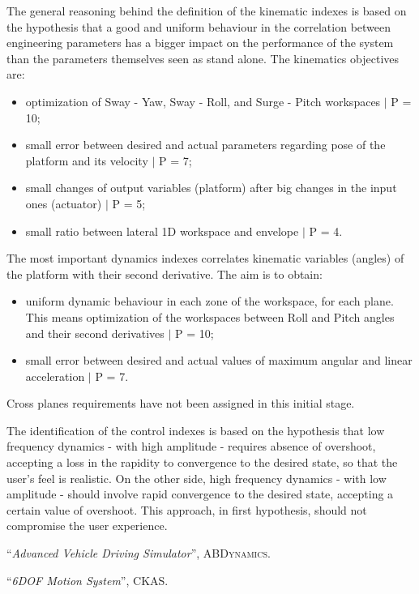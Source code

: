 \documentclass[10.5pt, twocolumn]{article}
\newcommand{\Virgolette}[1]{``#1''}
\begin{document}
The general reasoning behind the definition of the kinematic indexes is based on the hypothesis that a good and uniform behaviour in the correlation between engineering parameters has a bigger impact on the performance of the system than the parameters themselves seen as stand alone.
The kinematics objectives are:
\begin{itemize}
	\item optimization of Sway - Yaw, Sway - Roll, and Surge - Pitch workspaces $\mid$ P = 10;
	\item small error between desired and actual parameters regarding pose of the platform and its velocity $\mid$ P = 7;
	\item small changes of output variables (platform) after big changes in the input ones (actuator) $\mid$ P = 5;
	\item small ratio between lateral 1D workspace and envelope $\mid$ P = 4.
\end{itemize}
The most important dynamics indexes correlates kinematic variables (angles) of the platform with their second derivative.
The aim is to obtain:
\begin{itemize}
	\item uniform dynamic behaviour in each zone of the workspace, for each plane. This means optimization of the workspaces between Roll and Pitch angles and their second derivatives $\mid$ P = 10;
	\item small error between desired and actual values of maximum angular and linear acceleration $\mid$ P = 7.
\end{itemize}
Cross planes requirements have not been assigned in this initial stage.

The identification of the control indexes is based on the hypothesis that low frequency dynamics - with high amplitude - requires absence of overshoot, accepting a loss in the rapidity to convergence to the desired state, so that the user's feel is realistic.
On the other side, high frequency dynamics - with low amplitude - should involve rapid convergence to the desired state, accepting a certain value of overshoot.
This approach, in first hypothesis, should not compromise the user experience.

\begin{thebibliography}{}
\Virgolette{\textit{Advanced Vehicle Driving Simulator}}, \textsc{ABDynamics}.

\Virgolette{\textit{6DOF Motion System}}, \textsc{CKAS}.

\end{thebibliography}
\end{document}
